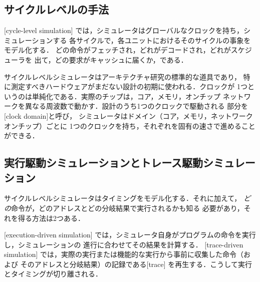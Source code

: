 \documentclass[../main.tex]{subfiles}
\begin{document}
\subsection{サイクルレベルの手法}

\begin{definition}[サイクルレベルシミュレーション]
  \label{def:l08-cycle-level}
  [cycle-level simulation]
  では，シミュレータはグローバルなクロックを持ち，シミュレーションする
  各サイクルで，各ユニットにおけるそのサイクルの事象をモデル化する．
  どの命令がフェッチされ，どれがデコードされ，どれがスケジューラを
  出て，どの要求がキャッシュに届くか，である．
\end{definition}

サイクルレベルシミュレータはアーキテクチャ研究の標準的な道具であり，
特に測定すべきハードウェアがまだない設計の初期に使われる．クロックが
1つというのは単純化である．実際のチップは，コア，メモリ，オンチップ
ネットワークを異なる周波数で動かす．設計のうち1つのクロックで駆動される
部分を[clock domain]と呼び，
シミュレータはドメイン（コア，メモリ，ネットワークオンチップ）ごとに
1つのクロックを持ち，それぞれを固有の速さで進めることができる．

\subsection{実行駆動シミュレーションとトレース駆動シミュレーション}

サイクルレベルシミュレータはタイミングをモデル化する．それに加えて，
\emph{どの}命令が，どのアドレスとどの分岐結果で実行されるかも知る
必要があり，それを得る方法は2つある．

\begin{definition}[実行駆動シミュレーションとトレース駆動シミュレーション]
  \label{def:l08-exec-trace}
  [execution-driven simulation]
  では，シミュレータ自身がプログラムの命令を実行し，シミュレーションの
  進行に合わせてその結果を計算する．
  [trace-driven simulation]
  では，実際の実行または機能的な実行から事前に収集した命令（および
  そのアドレスと分岐結果）の記録である[trace]
  を再生する．こうして実行とタイミングが切り離される．
\end{definition}
\end{document}
